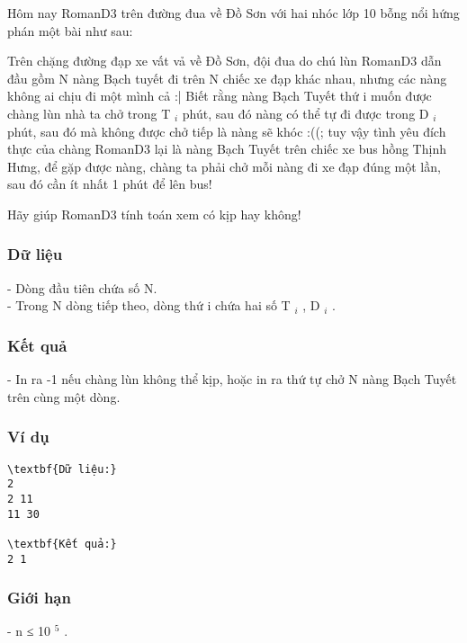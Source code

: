 







   Hôm nay RomanD3 trên đường đua về Đồ Sơn với hai nhóc lớp 10 bỗng nổi hứng phán một bài như sau:  

   Trên chặng đường đạp xe vất vả về Đồ Sơn, đội đua do chú lùn RomanD3 dẫn đầu gồm N nàng Bạch tuyết đi trên N chiếc xe đạp khác nhau, nhưng các nàng không ai chịu đi một mình cả :| Biết rằng nàng Bạch Tuyết thứ i muốn được chàng lùn nhà ta chở trong T   $_    i   $   phút, sau đó nàng có thể tự đi được trong D   $_    i   $   phút, sau đó mà không được chở tiếp là nàng sẽ khóc :((; tuy vậy tình yêu đích thực của chàng RomanD3 lại là nàng Bạch Tuyết trên chiếc xe bus hồng Thịnh Hưng, để gặp được nàng, chàng ta phải chở mỗi nàng đi xe đạp đúng một lần, sau đó cần ít nhất 1 phút để lên bus!  

   Hãy giúp RomanD3 tính toán xem có kịp hay không!  

\subsubsection{   Dữ liệu  }

   - Dòng đầu tiên chứa số N.   
\\   - Trong N dòng tiếp theo, dòng thứ i chứa hai số T   $_    i   $   , D   $_    i   $   .  

\subsubsection{   Kết quả  }

   - In ra -1 nếu chàng lùn không thể kịp, hoặc in ra thứ tự chở N nàng Bạch Tuyết trên cùng một dòng.  

\subsubsection{   Ví dụ  }
\begin{verbatim}
\textbf{Dữ liệu:}
2
2 11
11 30

\textbf{Kết quả:}
2 1
\end{verbatim}

\subsubsection{   Giới hạn  }

   - n ≤ 10   $^    5   $   .  

